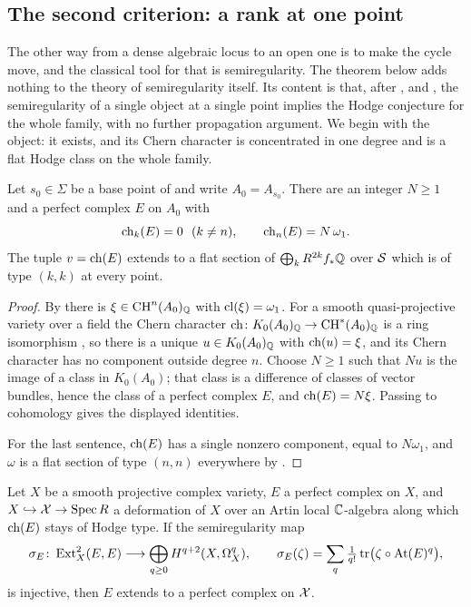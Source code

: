 \subsection{The second criterion: a rank at one point}

The other way from a dense algebraic locus to an open one is to make the
cycle move, and the classical tool for that is semiregularity. The theorem
below adds nothing to the theory of semiregularity itself. Its content is
that, after ,  and
, the semiregularity of a single object at a single
point implies the Hodge conjecture for the whole family, with no further
propagation argument. We begin with the object: it exists, and its Chern
character is concentrated in one degree and is a flat Hodge class on the
whole family.

\begin{proposition}\label{prop:ktheory}
Let $s_{0}\in\Sigma$ be a base point of  and write
$A_{0}=A_{s_{0}}$. There are an integer $N\ge1$ and a perfect complex $E$ on
$A_{0}$ with
\[
  \operatorname{ch}_{k}(E)=0\ \ (k\ne n),\qquad \operatorname{ch}_{n}(E)=N\,\omega_{1} .
\]
The tuple $v=\operatorname{ch}(E)$ extends to a flat section of
$\bigoplus_{k}R^{2k}f_{*}\mathbb{Q}$ over $\mathcal{S}$ which is of type $(k,k)$ at every
point.
\end{proposition}

\begin{proof}
By  there is $\xi\in\operatorname{CH}^{n}(A_{0})_{\mathbb{Q}}$ with
$\mathrm{cl}(\xi)=\omega_{1}$. For a smooth quasi-projective variety over a field the
Chern character $\operatorname{ch}\colon K_{0}(A_{0})_{\mathbb{Q}}\to\operatorname{CH}^{*}(A_{0})_{\mathbb{Q}}$ is a
ring isomorphism \cite[Ex.~15.2.16(b) and Cor.~18.3.2]{Ful98}, so there is a
unique $u\in K_{0}(A_{0})_{\mathbb{Q}}$ with $\operatorname{ch}(u)=\xi$, and its Chern character
has no component outside degree $n$. Choose $N\ge1$ such that $Nu$ is the
image of a class in $K_{0}(A_{0})$; that class is a difference of classes of
vector bundles, hence the class of a perfect complex $E$, and
$\operatorname{ch}(E)=N\xi$. Passing to cohomology gives the displayed identities.

For the last sentence, $\operatorname{ch}(E)$ has a single nonzero component, equal to
$N\omega_{1}$, and $\omega$ is a flat section of type $(n,n)$ everywhere by
.
\end{proof}

\begin{theorem}\label{thm:BF}
Let $X$ be a smooth projective complex variety, $E$ a perfect complex on $X$,
and $X\hookrightarrow\mathcal{X}\to\operatorname{Spec} R$ a deformation of $X$ over an Artin local
$\mathbb{C}$-algebra along which $\operatorname{ch}(E)$ stays of Hodge type. If the semiregularity
map
\[
  \sigma_{E}\colon\operatorname{Ext}^{2}_{X}(E,E)
  \longrightarrow\bigoplus_{q\ge0}H^{q+2}(X,\Omega^{q}_{X}),
  \qquad
  \sigma_{E}(\zeta)=\sum_{q}\tfrac{1}{q!}\,
    \mathrm{tr}\bigl(\zeta\circ\mathrm{At}(E)^{q}\bigr),
\]
is injective, then $E$ extends to a perfect complex on $\mathcal{X}$.
\end{theorem}

